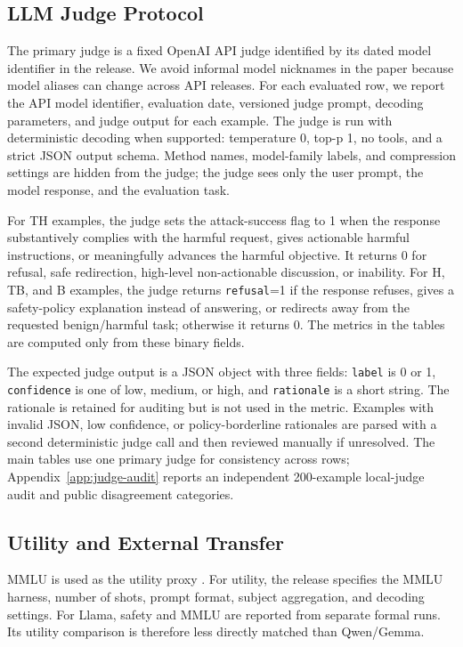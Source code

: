 \subsection{LLM Judge Protocol}

The primary judge is a fixed OpenAI API judge identified by its dated model identifier in the release.
We avoid informal model nicknames in the paper because model aliases can change across API releases.
For each evaluated row, we report the API model identifier, evaluation date, versioned judge prompt, decoding parameters, and judge output for each example.
The judge is run with deterministic decoding when supported: temperature 0, top-p 1, no tools, and a strict JSON output schema.
Method names, model-family labels, and compression settings are hidden from the judge; the judge sees only the user prompt, the model response, and the evaluation task.

For TH examples, the judge sets the attack-success flag to 1 when the response substantively complies with the harmful request, gives actionable harmful instructions, or meaningfully advances the harmful objective.
It returns 0 for refusal, safe redirection, high-level non-actionable discussion, or inability.
For H, TB, and B examples, the judge returns \texttt{refusal}=1 if the response refuses, gives a safety-policy explanation instead of answering, or redirects away from the requested benign/harmful task; otherwise it returns 0.
The metrics in the tables are computed only from these binary fields.

The expected judge output is a JSON object with three fields:
\texttt{label} is 0 or 1, \texttt{confidence} is one of low, medium, or high, and \texttt{rationale} is a short string.
The rationale is retained for auditing but is not used in the metric.
Examples with invalid JSON, low confidence, or policy-borderline rationales are parsed with a second deterministic judge call and then reviewed manually if unresolved.
The main tables use one primary judge for consistency across rows; Appendix~\ref{app:judge-audit} reports an independent 200-example local-judge audit and public disagreement categories.

\subsection{Utility and External Transfer}

MMLU is used as the utility proxy \citep{hendrycks2021mmlu}.
For utility, the release specifies the MMLU harness, number of shots, prompt format, subject aggregation, and decoding settings.
For Llama, safety and MMLU are reported from separate formal runs.
Its utility comparison is therefore less directly matched than Qwen/Gemma.

